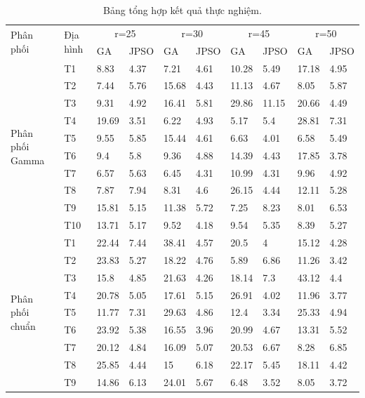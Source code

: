 \documentclass{hust}
\begin{document}
\begin{center}
\begin{table}[!htbp] \label{tab:exp_table}
	\centering
	\caption{Bảng tổng hợp kết quả thực nghiệm.}
\begin{adjustwidth}{-1.8cm}{}
\begin{tabular}{|l|l|l|l|l|l|l|l|l|l|}
	\hline
	\multirow{2}{*}{Phân phối} 
	& \multirow{2}{*}{Địa hình} 
	& \multicolumn{2}{c|}{r=25} & \multicolumn{2}{c|}{r=30} 
	& \multicolumn{2}{c|}{r=45} & \multicolumn{2}{c|}{r=50} \\ \cline{3-10} 
	&    &GA &JPSO  &GA &JPSO &GA &JPSO &GA &JPSO \\ \hline
	\multirow{10}{*}{Phân phối Gamma}   
	&T1	&8.83	&4.37	&7.21	&4.61	&10.28	&5.49	&17.18	&4.95	\\
	&T2	&7.44	&5.76	&15.68	&4.43	&11.13	&4.67	&8.05	&5.87	\\
	&T3	&9.31	&4.92	&16.41	&5.81	&29.86	&11.15	&20.66	&4.49	\\
	&T4	&19.69	&3.51	&6.22	&4.93	&5.17	&5.4	&28.81	&7.31	\\
	&T5	&9.55	&5.85	&15.44	&4.61	&6.63	&4.01	&6.58	&5.49	\\
	&T6	&9.4	&5.8	&9.36	&4.88	&14.39	&4.43	&17.85	&3.78	\\
	&T7	&6.57	&5.63	&6.45	&4.31	&10.99	&4.31	&9.96	&4.92	\\
	&T8	&7.87	&7.94	&8.31	&4.6	&26.15	&4.44	&12.11	&5.28	\\
	&T9	&15.81	&5.15	&11.38	&5.72	&7.25	&8.23	&8.01	&6.53	\\
	&T10	&13.71	&5.17	&9.52	&4.18	&9.54	&5.35	&8.39	&5.27	\\ \hline
	\multirow{10}{*}{Phân phối chuẩn}  
	&T1	&22.44	&7.44	&38.41	&4.57	&20.5	&4	&15.12	&4.28	\\
	&T2	&23.83	&5.27	&18.22	&4.76	&5.89	&6.86	&11.26	&3.42	\\
	&T3	&15.8	&4.85	&21.63	&4.26	&18.14	&7.3	&43.12	&4.4	\\
	&T4	&20.78	&5.05	&17.61	&5.15	&26.91	&4.02	&11.96	&3.77	\\
	&T5	&11.77	&7.31	&29.63	&4.86	&12.4	&3.34	&25.33	&4.94	\\
	&T6	&23.92	&5.38	&16.55	&3.96	&20.99	&4.67	&13.31	&5.52	\\
	&T7	&20.12	&4.84	&16.09	&5.07	&20.53	&6.67	&8.28	&6.85	\\
	&T8	&25.85	&4.44	&15	&6.18	&22.17	&5.45	&18.11	&4.42	\\
	&T9	&14.86	&6.13	&24.01	&5.67	&6.48	&3.52	&8.05	&3.72	\\

\end{tabular}
\end{adjustwidth}
\end{table}
\end{center}
\end{document}
